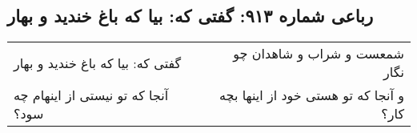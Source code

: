 \begin{center}
\section*{رباعی شماره ۹۱۳: گفتی که: بیا که باغ خندید و بهار}
\label{sec:0913}
\begin{longtable}{l p{0.5cm} r}
گفتی که: بیا که باغ خندید و بهار
&&
شمعست و شراب و شاهدان چو نگار
\\
آنجا که تو نیستی از اینهام چه سود؟
&&
و آنجا که تو هستی خود از اینها بچه کار؟
\\
\end{longtable}
\end{center}
